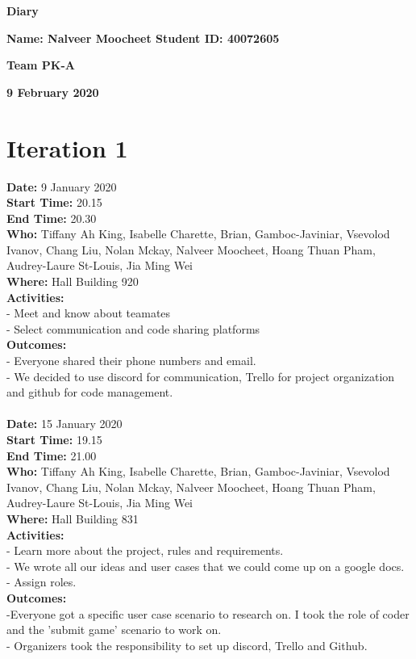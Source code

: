 \documentclass[12pt]{article}
\begin{document}
\vspace*{0.2in}
\centerline{\bf\Large Diary}

\vspace*{0.2in}
\centerline{\bf\Large Name: Nalveer Moocheet
Student ID: 40072605}

\vspace*{0.2in}
\centerline{\bf\Large Team PK-A}

\vspace*{0.2in}
\centerline{\bf\Large 9 February 2020}

\section{Iteration 1}

{\bf Date:} 9 January 2020 \\
{\bf Start Time:} 20.15 \\
{\bf End Time:} 20.30 \\
{\bf Who:} Tiffany Ah King, Isabelle Charette, Brian, Gamboc-Javiniar, Vsevolod Ivanov, Chang Liu, Nolan Mckay, Nalveer Moocheet, Hoang Thuan Pham, Audrey-Laure St-Louis, Jia Ming Wei \\
{\bf Where:} Hall Building 920 \\
{\bf Activities:}\\
- Meet and know about teamates\\ - Select communication and code sharing platforms \\
{\bf Outcomes:} \\
- Everyone shared their phone numbers and email. \\
- We decided to use discord for communication, Trello for project organization and github for code management.
\\
\\
{\bf Date:} 15 January 2020 \\
{\bf Start Time:} 19.15 \\
{\bf End Time:} 21.00 \\
{\bf Who:} Tiffany Ah King, Isabelle Charette, Brian, Gamboc-Javiniar, Vsevolod Ivanov, Chang Liu, Nolan Mckay, Nalveer Moocheet, Hoang Thuan Pham, Audrey-Laure St-Louis, Jia Ming Wei \\
{\bf Where:} Hall Building 831 \\
{\bf Activities:}\\
- Learn more about the project, rules and requirements.\\
- We wrote all our ideas and user cases that we could come up on a google docs.\\
- Assign roles.\\ 
{\bf Outcomes:}\\
-Everyone got a specific user case scenario to research on. I took the role of coder and  the 'submit game' scenario to work on. \\
- Organizers took the responsibility to set up discord, Trello and Github.\\
\end{document}
